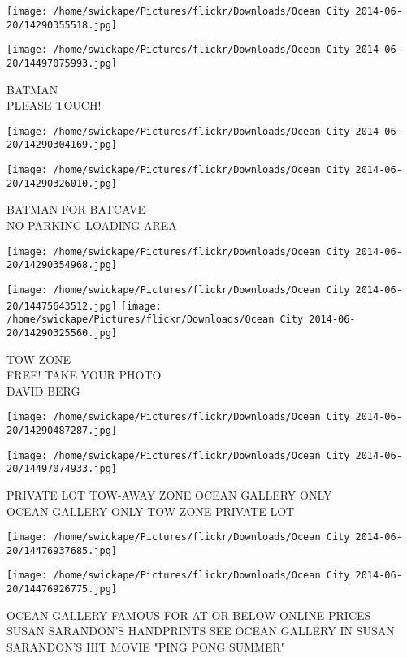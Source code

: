 \documentclass[10pt,letterpaper]{article}
\begin{document}
\texttt{[image: /home/swickape/Pictures/flickr/Downloads/Ocean City 2014-06-20/14290355518.jpg]}

\vspace{0.25in}
\texttt{[image: /home/swickape/Pictures/flickr/Downloads/Ocean City 2014-06-20/14497075993.jpg]}

BATMAN\\
PLEASE TOUCH!
\pagebreak

\texttt{[image: /home/swickape/Pictures/flickr/Downloads/Ocean City 2014-06-20/14290304169.jpg]}

\vspace{0.25in}
\texttt{[image: /home/swickape/Pictures/flickr/Downloads/Ocean City 2014-06-20/14290326010.jpg]}

BATMAN FOR BATCAVE\\
NO PARKING LOADING AREA
\pagebreak

\texttt{[image: /home/swickape/Pictures/flickr/Downloads/Ocean City 2014-06-20/14290354968.jpg]}

\vspace{0.25in}
\texttt{[image: /home/swickape/Pictures/flickr/Downloads/Ocean City 2014-06-20/14475643512.jpg]}
\texttt{[image: /home/swickape/Pictures/flickr/Downloads/Ocean City 2014-06-20/14290325560.jpg]}

TOW ZONE\\
FREE!  TAKE YOUR PHOTO\\
DAVID BERG
\pagebreak

\texttt{[image: /home/swickape/Pictures/flickr/Downloads/Ocean City 2014-06-20/14290487287.jpg]}

\vspace{0.25in}
\texttt{[image: /home/swickape/Pictures/flickr/Downloads/Ocean City 2014-06-20/14497074933.jpg]}

PRIVATE LOT TOW{-}AWAY ZONE OCEAN GALLERY ONLY\\
OCEAN GALLERY ONLY TOW ZONE PRIVATE LOT
\pagebreak

\texttt{[image: /home/swickape/Pictures/flickr/Downloads/Ocean City 2014-06-20/14476937685.jpg]}

\vspace{0.25in}
\texttt{[image: /home/swickape/Pictures/flickr/Downloads/Ocean City 2014-06-20/14476926775.jpg]}

OCEAN GALLERY FAMOUS FOR AT OR BELOW ONLINE PRICES\\
SUSAN SARANDON'S HANDPRINTS SEE OCEAN GALLERY IN SUSAN SARANDON'S HIT MOVIE "PING PONG SUMMER"
\pagebreak
\end{document}
